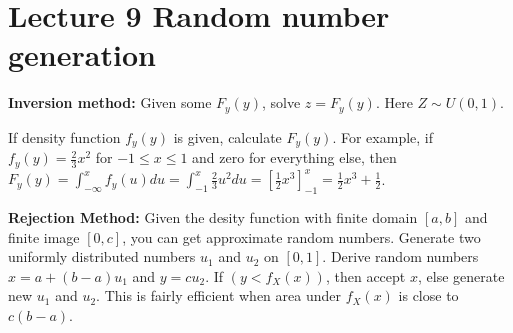 \section{Lecture 9 Random number generation}

\textbf{Inversion method:} Given some $F_y(y)$, solve $z=F_y(y)$. Here $Z \sim U(0,1)$.

If density function $f_y(y)$ is given, calculate $F_y(y)$. For example, if $f_y(y) = \frac{2}{3}x^2$ for $-1 \leq x \leq 1$ and zero for everything else, then $F_y(y) = \int^x_{-\infty} f_y(u) du = \int^x_{-1}\frac{2}{3}u^2 du = [\frac{1}{2}x^3]^x_{-1} = \frac{1}{2}x^
3 + \frac{1}{2}$.

\textbf{Rejection Method:} Given the desity function with finite domain $[a,b]$ and finite image $[0, c]$, you can get approximate random numbers. Generate two uniformly distributed numbers $u_1$ and $u_2$ on $[0,1]$. Derive random numbers $x = a + (b-a)u_1$ and $y = cu_2$. If $(y < f_X(x))$, then accept $x$, else generate new $u_1$ and $u_2$. This is fairly efficient when area under $f_X(x)$ is close to $c(b-a)$.\\~\\

\blindtext
